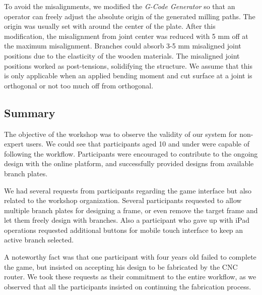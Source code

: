 To avoid the misalignments, we modified the \textit{G-Code Generator} so that an operator can freely adjust the absolute origin of the generated milling paths.
The origin was usually set with around the center of the plate.
After this modification, the misalignment from joint center was reduced with 5 mm off at the maximum misalignment.
Branches could absorb 3-5 mm misaligned joint positions due to the elasticity of the wooden materials.
The misaligned joint positions worked as post-tensions, solidifying the structure.
We assume that this is only applicable when an applied bending moment and cut surface at a joint is orthogonal or not too much off from orthogonal. 



\subsection{Summary}
The objective of the workshop was to observe the validity of our system for non-expert users.
We could see that participants aged 10 and under were capable of following the workflow.
Participants were encouraged to contribute to the ongoing design with the online platform, and successfully provided designs from available branch plates.

We had several requests from participants regarding the game interface but also related to the workshop organization. Several participants requested to allow multiple branch plates for designing a frame, or even remove the target frame and let them freely design with branches.
Also a participant who gave up with iPad operations requested additional buttons for mobile touch interface to keep an active branch selected.

A noteworthy fact was that one participant with four years old failed to complete the game, but insisted on accepting his design to be fabricated by the CNC router.
We took these requests as their commitment to the entire workflow, as we observed that all the participants insisted on continuing the fabrication process.
